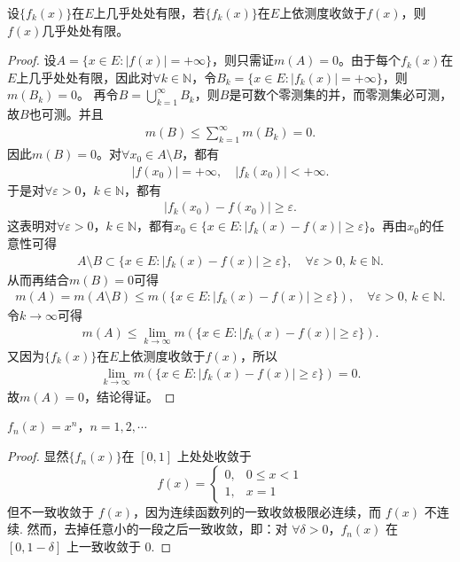 \documentclass[../../main.tex]{subfiles}
\begin{document}
\begin{theorem}\label{theorem:依测度收敛的极限函数必几乎处处有限}
设\(\{f_k(x)\}\)在\(E\)上几乎处处有限，若\(\{f_k(x)\}\)在\(E\)上依测度收敛于\(f(x)\)，则\(f(x)\)几乎处处有限。
\end{theorem}
\begin{proof}
设\(A = \{x \in E : |f(x)| = +\infty\}\)，则只需证\(m(A) = 0\)。由于每个\(f_k(x)\)在\(E\)上几乎处处有限，因此对\(\forall k \in \mathbb{N}\)，令\(B_k = \{x \in E : |f_k(x)| = +\infty\}\)，则\(m(B_k) = 0\)。
再令\(B = \bigcup_{k=1}^{\infty} B_k\)，则\(B\)是可数个零测集的并，而零测集必可测，故\(B\)也可测。并且
\begin{align*}
m(B) \leqslant \sum_{k=1}^{\infty} m(B_k) = 0.
\end{align*}
因此\(m(B) = 0\)。对\(\forall x_0 \in A \setminus B\)，都有
\begin{align*}
|f(x_0)| = +\infty, \quad |f_k(x_0)| < +\infty.
\end{align*}
于是对\(\forall \varepsilon > 0\)，\(k \in \mathbb{N}\)，都有
\begin{align*}
|f_k(x_0) - f(x_0)| \geqslant \varepsilon.
\end{align*}
这表明对\(\forall \varepsilon > 0\)，\(k \in \mathbb{N}\)，都有\(x_0 \in \{x \in E : |f_k(x) - f(x)| \geqslant \varepsilon\}\)。再由\(x_0\)的任意性可得
\begin{align*}
A \setminus B \subset \{x \in E : |f_k(x) - f(x)| \geqslant \varepsilon\}, \quad \forall \varepsilon > 0, \, k \in \mathbb{N}.
\end{align*}
从而再结合\(m(B) = 0\)可得
\begin{align*}
m(A) = m(A \setminus B) \leqslant m(\{x \in E : |f_k(x) - f(x)| \geqslant \varepsilon\}), \quad \forall \varepsilon > 0, \, k \in \mathbb{N}.
\end{align*}
令\(k \to \infty\)可得
\begin{align*}
m(A) \leqslant \lim_{k \to \infty} m(\{x \in E : |f_k(x) - f(x)| \geqslant \varepsilon\}).
\end{align*}
又因为\(\{f_k(x)\}\)在\(E\)上依测度收敛于\(f(x)\)，所以
\begin{align*}
\lim_{k \to \infty} m(\{x \in E : |f_k(x) - f(x)| \geqslant \varepsilon\}) = 0.
\end{align*}
故\(m(A) = 0\)，结论得证。

\end{proof}

\begin{example}[收敛但不一致收敛的函数]

$f_n(x)=x^n$，$n = 1,2,\cdots$ 
\end{example}
\begin{proof}
显然$\{f_n(x)\}$在 $[0,1]$ 上处处收敛于
\[
f(x)=
\begin{cases}
0, & 0\leqslant x<1 \\
1, & x = 1
\end{cases}
\]
但不一致收敛于 $f(x)$，因为连续函数列的一致收敛极限必连续，而 $f(x)$ 不连续. 然而，去掉任意小的一段之后一致收敛，即：对 $\forall\delta>0$，$f_n(x)$ 在 $[0,1 - \delta]$ 上一致收敛于 $0$.

\end{proof}
\end{document}
